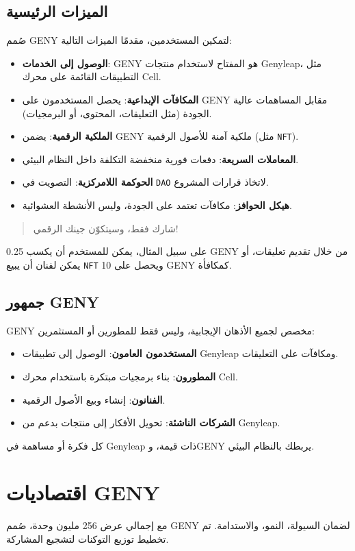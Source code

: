 \documentclass[a4paper,12pt,openany]{book}
\begin{document}
\subsection*{الميزات الرئيسية}
صُمم GENY لتمكين المستخدمين، مقدمًا الميزات التالية:
\begin{itemize}
    \item \textbf{الوصول إلى الخدمات}: GENY هو المفتاح لاستخدام منتجات Genyleap، مثل التطبيقات القائمة على محرك Cell.
    \item \textbf{المكافآت الإبداعية}: يحصل المستخدمون على GENY مقابل المساهمات عالية الجودة (مثل التعليقات، المحتوى، أو البرمجيات).
    \item \textbf{الملكية الرقمية}: يضمن GENY ملكية آمنة للأصول الرقمية (مثل \texttt{NFT}).
    \item \textbf{المعاملات السريعة}: دفعات فورية منخفضة التكلفة داخل النظام البيئي.
    \item \textbf{الحوكمة اللامركزية}: التصويت في \texttt{DAO} لاتخاذ قرارات المشروع.
    \item \textbf{هيكل الحوافز}: مكافآت تعتمد على الجودة، وليس الأنشطة العشوائية.
\end{itemize}
\begin{quote}
شارك فقط، وسيتكوّن جينك الرقمي!
\end{quote}
على سبيل المثال، يمكن للمستخدم أن يكسب 0.25 GENY من خلال تقديم تعليقات، أو يمكن لفنان أن يبيع \texttt{NFT} ويحصل على 10 GENY كمكافأة.

\subsection*{جمهور GENY}
GENY مخصص لجميع الأذهان الإيجابية، وليس فقط للمطورين أو المستثمرين:
\begin{itemize}
    \item \textbf{المستخدمون العامون}: الوصول إلى تطبيقات Genyleap ومكافآت على التعليقات.
    \item \textbf{المطورون}: بناء برمجيات مبتكرة باستخدام محرك Cell.
    \item \textbf{الفنانون}: إنشاء وبيع الأصول الرقمية.
    \item \textbf{الشركات الناشئة}: تحويل الأفكار إلى منتجات بدعم من Genyleap.
\end{itemize}
كل فكرة أو مساهمة في Genyleap ذات قيمة، وGENY يربطك بالنظام البيئي.
\newpage

\section*{اقتصاديات GENY}
مع إجمالي عرض 256 مليون وحدة، صُمم GENY لضمان السيولة، النمو، والاستدامة. تم تخطيط توزيع التوكنات لتشجيع المشاركة.
\end{document}
